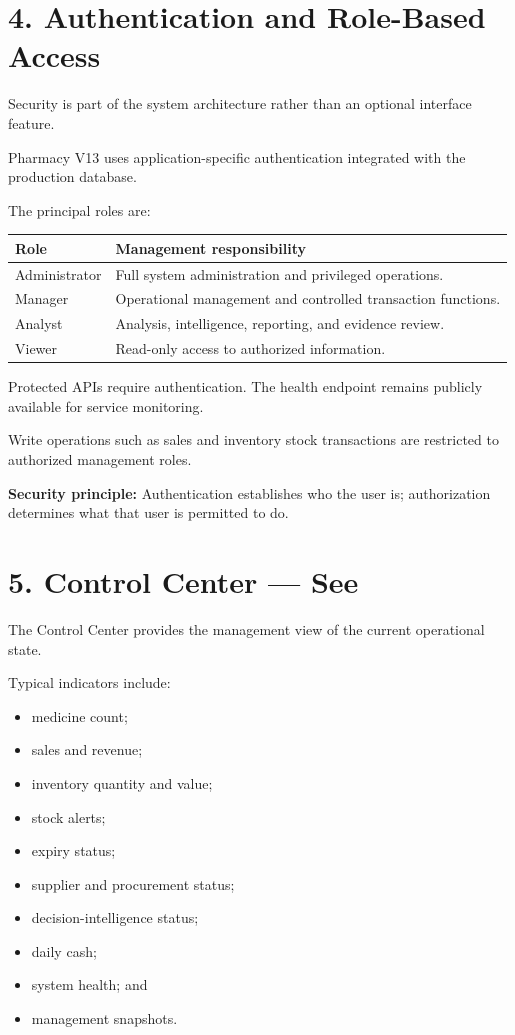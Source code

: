 \documentclass[12pt,a4paper]{article}
\begin{document}
\section*{4. Authentication and Role-Based Access}

Security is part of the system architecture rather than an optional interface feature.

Pharmacy V13 uses application-specific authentication integrated with the production database.

The principal roles are:

\begin{center}
\begin{tabularx}{0.9\textwidth}{lX}
\toprule
\textbf{Role} & \textbf{Management responsibility}\\
\midrule
Administrator & Full system administration and privileged operations.\\
Manager & Operational management and controlled transaction functions.\\
Analyst & Analysis, intelligence, reporting, and evidence review.\\
Viewer & Read-only access to authorized information.\\
\bottomrule
\end{tabularx}
\end{center}

Protected APIs require authentication. The health endpoint remains publicly available for service monitoring.

Write operations such as sales and inventory stock transactions are restricted to authorized management roles.

\begin{notebox}
\textbf{Security principle:}
Authentication establishes who the user is; authorization determines what that user is permitted to do.
\end{notebox}

\section*{5. Control Center --- See}

The Control Center provides the management view of the current operational state.

Typical indicators include:

\begin{itemize}[leftmargin=1cm]
\item medicine count;
\item sales and revenue;
\item inventory quantity and value;
\item stock alerts;
\item expiry status;
\item supplier and procurement status;
\item decision-intelligence status;
\item daily cash;
\item system health; and
\item management snapshots.
\end{itemize}
\end{document}
